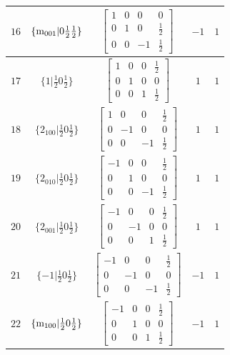 \documentclass[fleqn,8pt]{jsarticle}
\begin{document}
\begin{longtable}{ccccc}
$ 16 $ & $ \{{\rm m}_{001}|0 \frac{1}{2} \frac{1}{2}\} $ & $ \begin{bmatrix} 1 & 0 & 0 & 0 \\ 0 & 1 & 0 & \frac{1}{2} \\ 0 & 0 & -1 & \frac{1}{2} \end{bmatrix} $ & $ -1 $ & $ 1 $ \\ \hline
$ 17 $ & $ \{1|\frac{1}{2} 0 \frac{1}{2}\} $ & $ \begin{bmatrix} 1 & 0 & 0 & \frac{1}{2} \\ 0 & 1 & 0 & 0 \\ 0 & 0 & 1 & \frac{1}{2} \end{bmatrix} $ & $ 1 $ & $ 1 $ \\ \hline
$ 18 $ & $ \{2{}_{100}|\frac{1}{2} 0 \frac{1}{2}\} $ & $ \begin{bmatrix} 1 & 0 & 0 & \frac{1}{2} \\ 0 & -1 & 0 & 0 \\ 0 & 0 & -1 & \frac{1}{2} \end{bmatrix} $ & $ 1 $ & $ 1 $ \\ \hline
$ 19 $ & $ \{2{}_{010}|\frac{1}{2} 0 \frac{1}{2}\} $ & $ \begin{bmatrix} -1 & 0 & 0 & \frac{1}{2} \\ 0 & 1 & 0 & 0 \\ 0 & 0 & -1 & \frac{1}{2} \end{bmatrix} $ & $ 1 $ & $ 1 $ \\ \hline
$ 20 $ & $ \{2{}_{001}|\frac{1}{2} 0 \frac{1}{2}\} $ & $ \begin{bmatrix} -1 & 0 & 0 & \frac{1}{2} \\ 0 & -1 & 0 & 0 \\ 0 & 0 & 1 & \frac{1}{2} \end{bmatrix} $ & $ 1 $ & $ 1 $ \\ \hline
$ 21 $ & $ \{-1|\frac{1}{2} 0 \frac{1}{2}\} $ & $ \begin{bmatrix} -1 & 0 & 0 & \frac{1}{2} \\ 0 & -1 & 0 & 0 \\ 0 & 0 & -1 & \frac{1}{2} \end{bmatrix} $ & $ -1 $ & $ 1 $ \\ \hline
$ 22 $ & $ \{{\rm m}_{100}|\frac{1}{2} 0 \frac{1}{2}\} $ & $ \begin{bmatrix} -1 & 0 & 0 & \frac{1}{2} \\ 0 & 1 & 0 & 0 \\ 0 & 0 & 1 & \frac{1}{2} \end{bmatrix} $ & $ -1 $ & $ 1 $ \\ \hline

\end{longtable}
\end{document}
